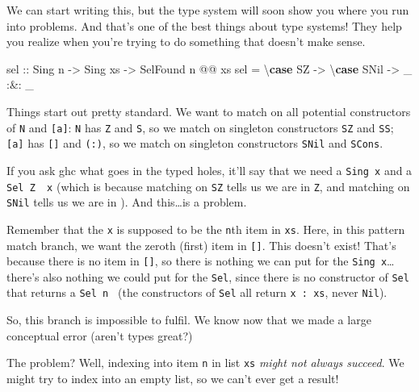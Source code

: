\documentclass[]{article}
\newenvironment{Shaded}{}{}
\newcommand{\DataTypeTok}[1]{\textcolor[rgb]{0.56,0.13,0.00}{#1}}
\newcommand{\FunctionTok}[1]{\textcolor[rgb]{0.02,0.16,0.49}{#1}}
\newcommand{\KeywordTok}[1]{\textcolor[rgb]{0.00,0.44,0.13}{\textbf{#1}}}
\newcommand{\NormalTok}[1]{#1}
\newcommand{\OtherTok}[1]{\textcolor[rgb]{0.00,0.44,0.13}{#1}}
\begin{document}
We can start writing this, but the type system will soon show you where you run
into problems. And that's one of the best things about type systems! They help
you realize when you're trying to do something that doesn't make sense.

\begin{Shaded}
\begin{Highlighting}[]
\OtherTok{sel ::} \DataTypeTok{Sing}\NormalTok{ n}
    \OtherTok{->} \DataTypeTok{Sing}\NormalTok{ xs}
    \OtherTok{->} \DataTypeTok{SelFound}\NormalTok{ n }\FunctionTok{@@}\NormalTok{ xs}
\NormalTok{sel }\FunctionTok{=}\NormalTok{ \textbackslash{}}\KeywordTok{case}
    \DataTypeTok{SZ} \OtherTok{->}\NormalTok{ \textbackslash{}}\KeywordTok{case}
      \DataTypeTok{SNil} \OtherTok{->}\NormalTok{ _ }\FunctionTok{:&:}\NormalTok{ _}
\end{Highlighting}
\end{Shaded}

Things start out pretty standard. We want to match on all potential constructors
of \texttt{N} and \texttt{{[}a{]}}: \texttt{N} has \texttt{Z} and \texttt{S}, so
we match on singleton constructors \texttt{SZ} and \texttt{SS}; \texttt{{[}a{]}}
has \texttt{{[}{]}} and \texttt{(:)}, so we match on singleton constructors
\texttt{SNil} and \texttt{SCons}.

If you ask ghc what goes in the typed holes, it'll say that we need a
\texttt{Sing\ x} and a
\texttt{Sel\ \textquotesingle{}Z\ \textquotesingle{}{[}{]}\ x} (which is because
matching on \texttt{SZ} tells us we are in \texttt{\textquotesingle{}Z}, and
matching on \texttt{SNil} tells us we are in \texttt{\textquotesingle{}{[}{]}}).
And this\ldots{}is a problem.

Remember that the \texttt{x} is supposed to be the \texttt{n}th item in
\texttt{xs}. Here, in this pattern match branch, we want the zeroth (first) item
in \texttt{{[}{]}}. This doesn't exist! That's because there is no item in
\texttt{{[}{]}}, so there is nothing we can put for the
\texttt{Sing\ x}\ldots{}there's also nothing we could put for the \texttt{Sel},
since there is no constructor of \texttt{Sel} that returns a
\texttt{Sel\ n\ \textquotesingle{}{[}{]}} (the constructors of \texttt{Sel} all
return \texttt{x\ \textquotesingle{}:\ xs}, never \texttt{Nil}).

So, this branch is impossible to fulfil. We know now that we made a large
conceptual error (aren't types great?)

The problem? Well, indexing into item \texttt{n} in list \texttt{xs} \emph{might
not always succeed}. We might try to index into an empty list, so we can't ever
get a result!
\end{document}
